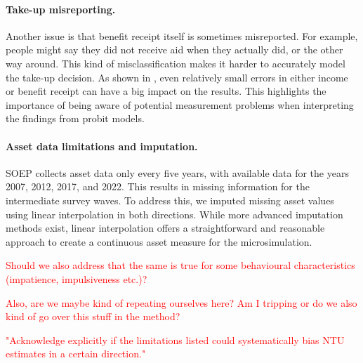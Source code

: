 \paragraph{Take-up misreporting.} Another issue is that benefit receipt itself is sometimes misreported. For example, people might say they did not receive aid when they actually did, or the other way around. This kind of misclassification makes it harder to accurately model the take-up decision. As shown in \cite{pudney_impact_2001}, even relatively small errors in either income or benefit receipt can have a big impact on the results. This highlights the importance of being aware of potential measurement problems when interpreting the findings from probit models.

\paragraph{Asset data limitations and imputation.}
SOEP collects asset data only every five years, with available data for the years 2007, 2012, 2017, and 2022. 
This results in missing information for the intermediate survey waves. 
To address this, we imputed missing asset values using linear interpolation in both directions. 
While more advanced imputation methods exist, linear interpolation offers a straightforward and reasonable approach to create a continuous asset measure for the microsimulation.

\textcolor{red}{Should we also address that the same is true for some behavioural characteristics (impatience, impulsiveness etc.)?}

\textcolor{red}{Also, are we maybe kind of repeating ourselves here? Am I tripping or do we also kind of go over this stuff in the method?}

\textcolor{red}{"Acknowledge explicitly if the limitations listed could systematically bias NTU estimates in a certain direction."}